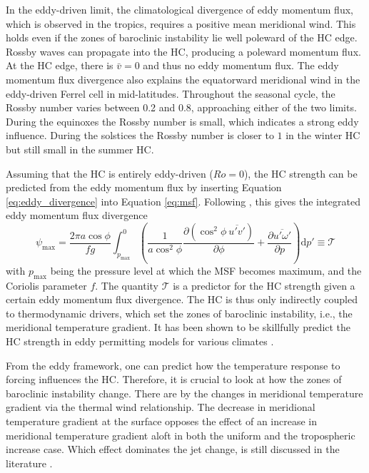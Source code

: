 In the eddy-driven limit, the climatological divergence of eddy momentum flux, which is observed in the tropics, requires a positive mean meridional wind. This holds even if the zones of baroclinic instability lie well poleward of the HC edge. Rossby waves can propagate into the HC, producing a poleward momentum flux. At the HC edge, there is $\bar{v}=0$ and thus no eddy momentum flux. The eddy momentum flux divergence also explains the equatorward meridional wind in the eddy-driven Ferrel cell in mid-latitudes. Throughout the seasonal cycle, the Rossby number varies between 0.2 and 0.8, approaching either of the two limits. During the equinoxes the Rossby number is small, which indicates a strong eddy influence. During the solstices the Rossby number is closer to $1$ in the winter HC but still small in the summer HC.



Assuming that the HC is entirely eddy-driven ($Ro=0$), the HC strength can be predicted from the eddy momentum flux by inserting Equation \eqref{eq:eddy_divergence} into Equation \eqref{eq:msf}. Following \textcite{walkerEddyInfluencesHadley2006}, this gives the integrated eddy momentum flux divergence
\begin{equation}\label{eq:T_edd}
    \psi_\mathrm{max}=\frac{2\pi a\cos\phi}{fg}\int^0_{p_\mathrm{max}}\left(\frac{1}{a\cos^2\phi}\frac{\partial (\cos^2\phi\ \overline{u'v'})}{\partial\phi} + \frac{\partial\overline{u'\omega'}}{\partial p}\right)\mathrm{d}p'\equiv \mathcal{T} 
\end{equation}
with $p_\mathrm{max}$ being the pressure level at which the MSF becomes maximum, and the Coriolis parameter $f$. The quantity $\mathcal{T}$ is a predictor for the HC strength given a certain eddy momentum flux divergence. The HC is thus only indirectly coupled to thermodynamic drivers, which set the zones of baroclinic instability, i.e., the meridional temperature gradient. It has been shown to be skillfully predict the HC strength in eddy permitting models for various climates \parencite{walkerEddyInfluencesHadley2006}. 

From the eddy framework, one can predict how the temperature response to \CO{} forcing influences the HC. Therefore, it is crucial to look at how the zones of baroclinic instability change. There are by the changes in meridional temperature gradient via the thermal wind relationship. The decrease in meridional temperature gradient at the surface opposes the effect of an increase in meridional temperature gradient aloft in both the uniform and the tropospheric \CO{} increase case. Which effect dominates the jet change, is still discussed in the literature \parencite{ossoAdvancingOurUnderstanding2024}.

